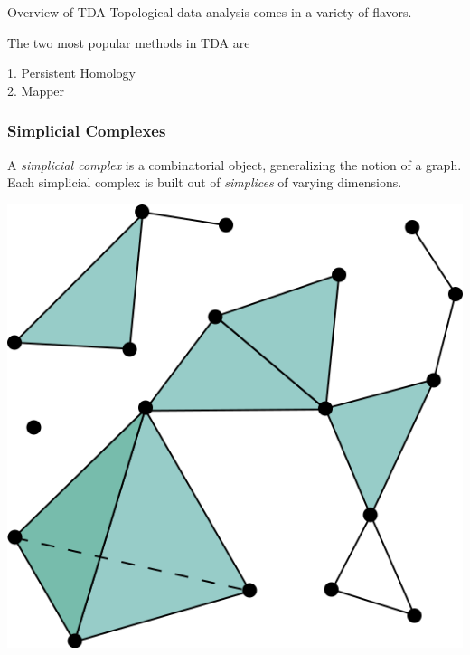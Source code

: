 \documentclass[usenames,dvipsnames,aspectratio=1610]{beamer}
\begin{document}
\begin{frame}{Overview of TDA}
  Topological data analysis comes in a variety of flavors. 
  
  The two most popular methods in TDA are
  \begin{center}
    1. Persistent Homology \\
    2.  Mapper
  \end{center}
\end{frame}




\begin{frame}
  \frametitle{Simplicial Complexes}
  A {\em simplicial complex} is a combinatorial object, generalizing the notion of a graph. Each
  simplicial complex is built out of {\em simplices} of varying dimensions.

  \begin{center}
    \includegraphics[scale=0.35]{Simplicial_complex_example.png}
  \end{center}
\end{frame}
\end{document}
